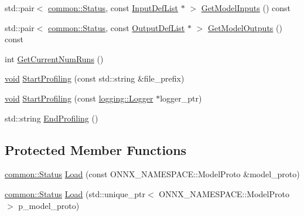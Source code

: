 \begin{DoxyCompactItemize}
\item 
std\+::pair$<$ \mbox{\hyperlink{classonnxruntime_1_1common_1_1Status}{common\+::\+Status}}, const \mbox{\hyperlink{namespaceonnxruntime_ab363b0109a9af018fb3e355aac00a360}{Input\+Def\+List}} $\ast$ $>$ \mbox{\hyperlink{classonnxruntime_1_1InferenceSession_ae8519d7cd45b56ba6bf83c13757cd55e}{Get\+Model\+Inputs}} () const
\item 
std\+::pair$<$ \mbox{\hyperlink{classonnxruntime_1_1common_1_1Status}{common\+::\+Status}}, const \mbox{\hyperlink{namespaceonnxruntime_a4b3c292f33b95d038b5059f6103f287a}{Output\+Def\+List}} $\ast$ $>$ \mbox{\hyperlink{classonnxruntime_1_1InferenceSession_a7a705fa4164dc161e76a7641820fe65a}{Get\+Model\+Outputs}} () const
\item 
int \mbox{\hyperlink{classonnxruntime_1_1InferenceSession_a9dbfd5df60f36c82833248db96dbe8fc}{Get\+Current\+Num\+Runs}} ()
\item 
\mbox{\hyperlink{mlasi_8h_a88f941d423cb2a819b70a1358982b1a6}{void}} \mbox{\hyperlink{classonnxruntime_1_1InferenceSession_ab29bd2f63b9f4d5840e846f8bf705e8a}{Start\+Profiling}} (const std\+::string \&file\+\_\+prefix)
\item 
\mbox{\hyperlink{mlasi_8h_a88f941d423cb2a819b70a1358982b1a6}{void}} \mbox{\hyperlink{classonnxruntime_1_1InferenceSession_a7d688c79939567a953aa7f1b3559c7b7}{Start\+Profiling}} (const \mbox{\hyperlink{classonnxruntime_1_1logging_1_1Logger}{logging\+::\+Logger}} $\ast$logger\+\_\+ptr)
\item 
std\+::string \mbox{\hyperlink{classonnxruntime_1_1InferenceSession_ac9e69b0d77c3afb6c0fcad0969cfca17}{End\+Profiling}} ()
\end{DoxyCompactItemize}
\subsection*{Protected Member Functions}
\begin{DoxyCompactItemize}
\item 
\mbox{\hyperlink{classonnxruntime_1_1common_1_1Status}{common\+::\+Status}} \mbox{\hyperlink{classonnxruntime_1_1InferenceSession_aa5f2da68be50bff8a01e9801c28c77b2}{Load}} (const O\+N\+N\+X\+\_\+\+N\+A\+M\+E\+S\+P\+A\+C\+E\+::\+Model\+Proto \&model\+\_\+proto)
\item 
\mbox{\hyperlink{classonnxruntime_1_1common_1_1Status}{common\+::\+Status}} \mbox{\hyperlink{classonnxruntime_1_1InferenceSession_aa26b302ae1387cbd87025470a8ebb449}{Load}} (std\+::unique\+\_\+ptr$<$ O\+N\+N\+X\+\_\+\+N\+A\+M\+E\+S\+P\+A\+C\+E\+::\+Model\+Proto $>$ p\+\_\+model\+\_\+proto)
\end{DoxyCompactItemize}


